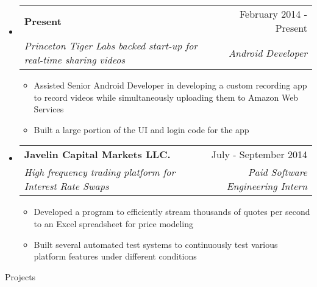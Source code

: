 \documentclass[letterpaper,11pt]{article}
\makeatletter
\newcommand{\resitem}[1]{\item #1 \vspace{-2pt}}
\newcommand{\resheading}[1]{{\large \parashade[.9]{sharpcorners}{\textbf{#1 \vphantom{p\^{E}}}}}}
\newcommand{\ressubheading}[4]{
\begin{tabular*}{6.5in}{l@{\extracolsep{\fill}}r}
		\textbf{#1} & #2 \\
		\textit{#3} & \textit{#4} \\
\end{tabular*}\vspace{-6pt}}
\makeatother
\begin{document}
\begin{itemize}
\item
	\ressubheading{Present}{February 2014 - Present}
		{Princeton Tiger Labs backed start-up for real-time 				sharing videos} {Android Developer}
		\begin {itemize}
		\resitem{Assisted Senior Android Developer in 						developing a custom recording app to record videos 				while simultaneously uploading them to Amazon Web 				Services}
		\resitem{Built a large portion of the UI and login code 			for the app}
		\end{itemize}
\end{itemize}
\begin{itemize}
	\item
		\ressubheading{Javelin Capital Markets LLC.}{July - 					September 2014}
			{High frequency trading platform for Interest Rate 				Swaps}{Paid Software Engineering Intern}
	\begin{itemize}
		\resitem{Developed a program to efficiently stream 					thousands of quotes per second to an Excel 						spreadsheet for price modeling}
		\resitem{Built several automated test systems to 						continuously test various platform features under 				different conditions}
	\end{itemize}
\end{itemize}

\begin{description} 
	\item[Projects] 
\end{description}
\end{document}

